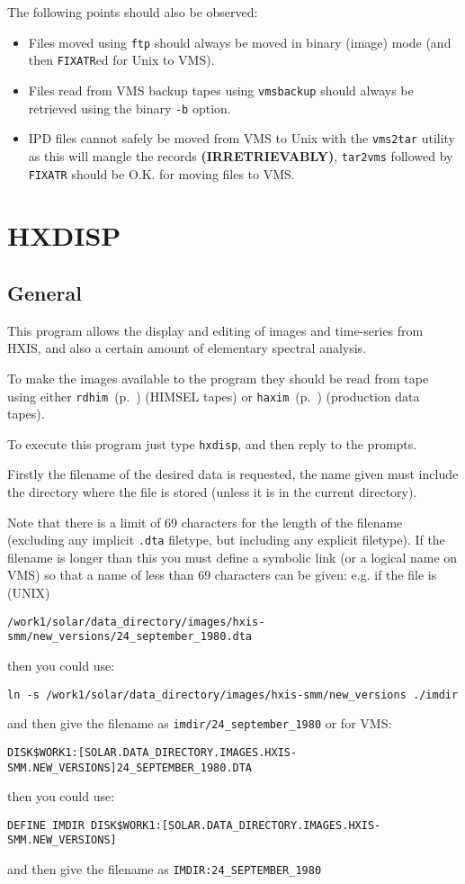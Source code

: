 The following points should also be observed:
\begin{itemize}
\item Files moved using \verb!ftp! should always be moved in binary (image)
mode (and then \verb!FIXATR!ed for Unix to VMS).
\item Files read from VMS backup tapes using \verb!vmsbackup! should
always be retrieved using the binary \verb!-b! option.
\item IPD files cannot safely be moved from VMS to Unix with the
\verb!vms2tar! utility as this will mangle the records {\bf
(IRRETRIEVABLY)}, \verb!tar2vms!
followed by \verb!FIXATR! should be O.K. for moving files to VMS.
\end{itemize}


\section{HXDISP}
\label{HXDISP}

\subsection{General}

This program allows the display and editing of images and time-series
from HXIS, and also a certain amount of elementary spectral analysis.

To make the images available to the program they should be read from
tape using either \verb!rdhim!~(p.~\pageref{RDHIM}) (HIMSEL tapes) or
\verb!haxim!~(p.~\pageref{HAXIM}) (production data tapes).

To execute this program just type \verb!hxdisp!, and then reply to the
prompts.

Firstly the filename of the desired data is requested, the name given
must include the directory where the file is stored (unless it is in
the current directory).

Note that there is a limit of 69
\label{longname} characters for the length of the filename (excluding any
implicit {\tt .dta} filetype, but including any explicit filetype).  If
the filename is longer than this you must define a symbolic link (or a
logical name on VMS) so that a name of less than 69 characters can be
given: e.g. if the file is (UNIX)
\begin{verbatim}
/work1/solar/data_directory/images/hxis-smm/new_versions/24_september_1980.dta
\end{verbatim}
then you could use:
\begin{verbatim}
ln -s /work1/solar/data_directory/images/hxis-smm/new_versions ./imdir
\end{verbatim}
and then give the filename as \verb!imdir/24_september_1980! or for VMS:
\begin{verbatim}
DISK$WORK1:[SOLAR.DATA_DIRECTORY.IMAGES.HXIS-SMM.NEW_VERSIONS]24_SEPTEMBER_1980.DTA
\end{verbatim}
then you could use:
\begin{verbatim}
DEFINE IMDIR DISK$WORK1:[SOLAR.DATA_DIRECTORY.IMAGES.HXIS-SMM.NEW_VERSIONS]
\end{verbatim} 
and then give the filename as \verb!IMDIR:24_SEPTEMBER_1980!

